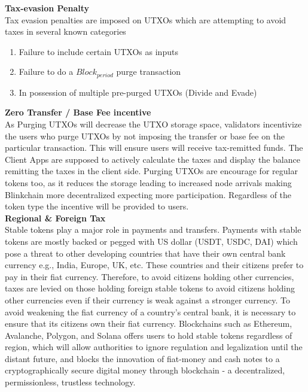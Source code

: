 \documentclass[letterpaper,11pt]{article}
\begin{document}
\textbf{Tax-evasion Penalty}\\

Tax evasion penalties are imposed on UTXOs which are attempting to avoid taxes in several known categories 
\begin{enumerate}
\item Failure to include certain UTXOs as inputs 
\item Failure to do a $Block_{period}$ purge transaction 
\item In possession of multiple pre-purged UTXOs (Divide and Evade)
\end{enumerate} 


\textbf{Zero Transfer / Base Fee incentive}\\

As Purging UTXOs will decrease the UTXO storage space, validators incentivize the users who purge UTXOs by not imposing the transfer or base fee on the particular transaction. This will ensure users will receive tax-remitted funds. The Client Apps are supposed to actively calculate the taxes and display the balance remitting the taxes in the client side. Purging UTXOs are encourage for regular tokens too, as it reduces the storage leading to increased node arrivals making Blinkchain more decentralized expecting more participation. Regardless of the token type the incentive will be provided to users.\\

\textbf{Regional \& Foreign Tax}\\

Stable tokens play a major role in payments and transfers. Payments with stable tokens are mostly backed or pegged with US dollar (USDT, USDC, DAI) which pose a threat to other developing countries that have their own central bank currency e.g., India, Europe, UK, etc. These countries and their citizens prefer to pay in their fiat currency. Therefore, to avoid citizens holding other currencies, taxes are levied on those holding foreign stable tokens to avoid citizens holding other currencies even if their currency is weak against a stronger currency. To avoid weakening the fiat currency of a country's central bank, it is necessary to ensure that its citizens own their fiat currency. Blockchains such as Ethereum, Avalanche, Polygon, and Solana offers users to hold stable tokens regardless of region, which will allow authorities to ignore regulation and legalization until the distant future, and blocks the innovation of fiat-money and cash notes to a cryptographically secure digital money through blockchain - a decentralized, permissionless, trustless technology.\\
\end{document}
